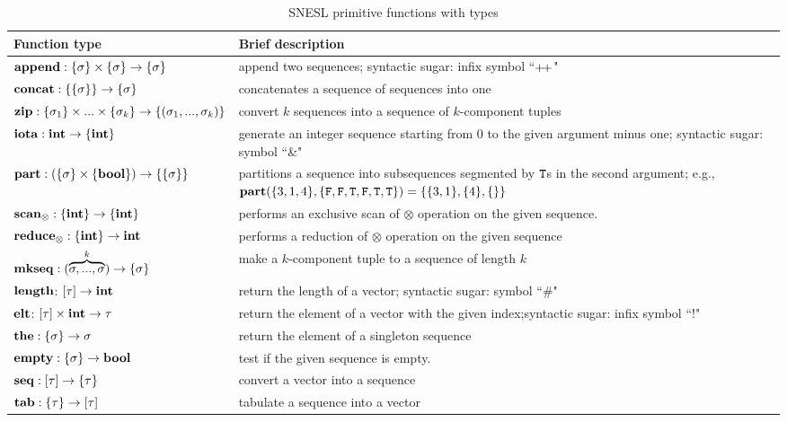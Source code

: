 \begin{table}\large
	\renewcommand\arraystretch{1.5}
	\centering
	\begin{tabular}{|p{}|p{}|}
		\hline
		Function type & Brief description  \\ \hline
		$\mathbf{append : \{\sigma\} \times \{\sigma\} \rightarrow \{\sigma\}}$ & append two sequences; syntactic sugar: infix symbol ``${\++}$" \\ \hline
		$\mathbf{concat: \{\{\sigma\}\} \rightarrow \{\sigma\} }$ &  concatenates a sequence of sequences into one                    \\ \hline
		$\mathbf{zip}: \{\sigma_1\} \times ... \times \{\sigma_k\}  \rightarrow \{(\sigma_1,...,\sigma_k)\}$ & convert $k$ sequences into a sequence of $k$-component tuples \\ \hline
		$\mathbf{iota: \mathbf{int} \rightarrow \{\mathbf{int}\}}$  &  generate an integer sequence starting from 0 to the given argument minus one; syntactic sugar: symbol ``\&"    \\ \hline
		$\mathbf{part: (\{\sigma\} \times \{\mathbf{bool}\}) \rightarrow  \{\{\sigma\}\}}$   & partitions a sequence into subsequences segmented by $\mathtt{T}$s in the second argument; e.g., $\mathbf{part}(\{3,1,4\}, \{\mathtt{F},\mathtt{F},\mathtt{T},\mathtt{F},\mathtt{T},\mathtt{T}\}) = \{\{3,1\},\{4\},\{\}\}$                \\ \hline
		$\mathbf{scan_\otimes}: \{\mathbf{int}\} \rightarrow \{\mathbf{int}\}$     &  performs an exclusive scan of $\otimes$ operation on the given sequence.    \\ \hline
		$\mathbf{reduce_\otimes: \{\mathbf{int}\} \rightarrow \mathbf{int} }$     &   performs a reduction of $\otimes$ operation on the given sequence             \\ \hline
		$\mathbf{mkseq}: (\overbrace{\sigma,...,\sigma}^{k}) \rightarrow \{\sigma\}$  & make a $k$-component tuple to a sequence of length $k$ \\ \hline  
	    $\mathbf{length}$: $[\tau] \rightarrow \mathbf{int}$ & return the length of a vector; syntactic sugar: symbol ``\#" \\ \hline  
	    $\mathbf{elt}$: $[\tau] \times \mathbf{int} \rightarrow \tau$  & return the  element of a vector with the given index;syntactic sugar: infix symbol ``!" \\ \hline  
	    $\mathbf{the:  \{\sigma\} \rightarrow \sigma}$     &     return the element of a singleton sequence           \\ \hline
	    $\mathbf{empty:  \{\sigma\} \rightarrow \mathbf{bool}}$       & test if the given sequence is empty.             \\ \hline  
	    $\mathbf{seq}: [\tau] \rightarrow \{\tau\} $  & convert a vector into a sequence \\ \hline  
	    $\mathbf{tab}: \{\tau\} \rightarrow [\tau] $  & tabulate a sequence into a vector\\ \hline  
	\end{tabular}
	\caption{SNESL primitive functions with types}
	\label{tab:snesl-funcs}
\end{table}




